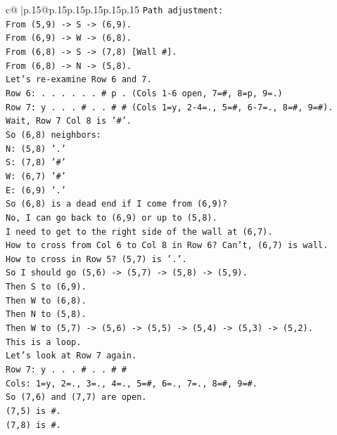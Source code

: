 \documentclass{article}
\begin{document}
{\begin{supertabular}{c@{$\;$}|p{.15\linewidth}@{}p{.15\linewidth}p{.15\linewidth}p{.15\linewidth}p{.15\linewidth}p{.15\linewidth}}
{{{\texttt{Path adjustment:} \\
\texttt{From (5,9) {-}> S {-}> (6,9).} \\
\texttt{From (6,9) {-}> W {-}> (6,8).} \\
\texttt{From (6,8) {-}> S {-}> (7,8) {[}Wall \#{]}.} \\
\texttt{From (6,8) {-}> N {-}> (5,8).} \\
\texttt{Let's re{-}examine Row 6 and 7.} \\
\texttt{Row 6: . . . . . . \# p . (Cols 1{-}6 open, 7=\#, 8=p, 9=.)} \\
\texttt{Row 7: y . . . \# . . \# \# (Cols 1=y, 2{-}4=., 5=\#, 6{-}7=., 8=\#, 9=\#).} \\
\texttt{Wait, Row 7 Col 8 is '\#'.} \\
\texttt{So (6,8) neighbors:} \\
\texttt{N: (5,8) '.'} \\
\texttt{S: (7,8) '\#'} \\
\texttt{W: (6,7) '\#'} \\
\texttt{E: (6,9) '.'} \\
\texttt{So (6,8) is a dead end if I come from (6,9)?} \\
\texttt{No, I can go back to (6,9) or up to (5,8).} \\
\texttt{I need to get to the right side of the wall at (6,7).} \\
\texttt{How to cross from Col 6 to Col 8 in Row 6? Can't, (6,7) is wall.} \\
\texttt{How to cross in Row 5? (5,7) is '.'.} \\
\texttt{So I should go (5,6) {-}> (5,7) {-}> (5,8) {-}> (5,9).} \\
\texttt{Then S to (6,9).} \\
\texttt{Then W to (6,8).} \\
\texttt{Then N to (5,8).} \\
\texttt{Then W to (5,7) {-}> (5,6) {-}> (5,5) {-}> (5,4) {-}> (5,3) {-}> (5,2).} \\
\texttt{This is a loop.} \\
\texttt{Let's look at Row 7 again.} \\
\texttt{Row 7: y . . . \# . . \# \#} \\
\texttt{Cols: 1=y, 2=., 3=., 4=., 5=\#, 6=., 7=., 8=\#, 9=\#.} \\
\texttt{So (7,6) and (7,7) are open.} \\
\texttt{(7,5) is \#.} \\
\texttt{(7,8) is \#.} \\
}}}
\end{supertabular}}
\end{document}
